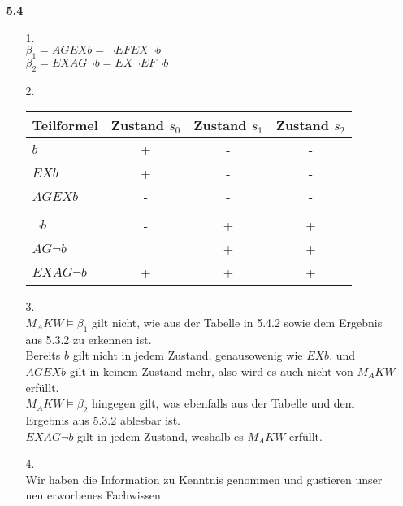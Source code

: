 \documentclass[a4paper,11pt,fleqn]{scrartcl}
\begin{document}
\begin{enumerate}
		\newpage
                \item[\textbf{5.4}]
                \begin{enumerate}
                        \item[1.]\quad \\
                        	$\beta_1 = AGEXb = \neg EFEX \neg b$ \\
                            $\beta_2 = EXAG \neg b = EX \neg EF \neg b$
                        \item[2.]\quad \\
                        	\begin{tabular}{l|c|c|c}
                            	Teilformel & Zustand $s_0$ & Zustand $s_1$ & Zustand $s_2$\\
                                \hline
                                \hline
                                $b$&+&-&-\\
                                \hline
                                $EXb$& + & - & -\\
                                \hline
                                $AGEXb$& - & - & -\\
                                \hline
                                & & & \\
                                \hline
                                $\neg b$& - & + & +\\
                                \hline
                                $AG \neg b$& - & + & +\\
                                \hline
                                $EXAG \neg b$& + & + & +\\
                            \end{tabular}
                        \item[3.]\quad \\
                        	$M_AKW \models \beta_1$ gilt nicht, wie aus der Tabelle in 5.4.2 sowie dem Ergebnis 
                        	aus 5.3.2 zu erkennen ist. \\
                           	Bereits $b$ gilt nicht in jedem Zustand, genausowenig wie $EXb$, und $AGEXb$ gilt 
                           	in keinem Zustand mehr, also wird es auch nicht von $M_AKW$ erfüllt. \\
                            $M_AKW \models \beta_2$ hingegen gilt, was ebenfalls aus der Tabelle und 
                            dem Ergebnis aus 5.3.2 ablesbar ist.\\
                            $EXAG \neg b$ gilt in jedem Zustand, weshalb es $M_AKW$ erfüllt.
                        \item[4.]\quad \\
                        	Wir haben die Information zu Kenntnis genommen und gustieren 
                        	unser neu erworbenes Fachwissen.
		\end{enumerate}
	\end{enumerate}
\end{document}
